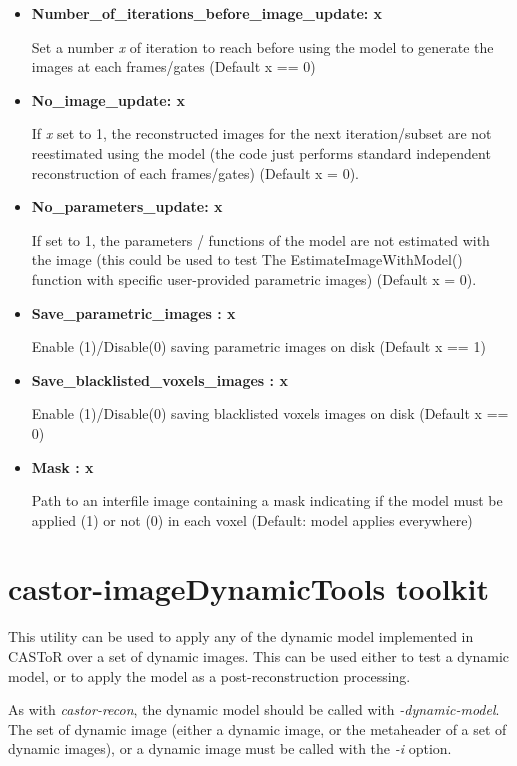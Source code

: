 \documentclass[a4paper, 11pt]{article}
\begin{document}
\begin{itemize}
\item \textbf{Number\_of\_iterations\_before\_image\_update: x}  

Set a number \textit{x} of iteration to reach before using the model to generate the images at each frames/gates (Default x ==  0) 
   
\item \textbf{No\_image\_update: x } 

If \textit{x} set to 1, the reconstructed images for the next iteration/subset are not reestimated using the model (the code just performs standard independent reconstruction of each frames/gates) (Default x = 0).       
          
\item \textbf{No\_parameters\_update: x} 

If set to 1, the parameters / functions of the model are not estimated with the image (this could be used to test The EstimateImageWithModel() function with specific user-provided parametric images) (Default x = 0).
   
\item \textbf{Save\_parametric\_images : x } 

Enable (1)/Disable(0) saving parametric images on disk (Default x == 1)  

\item \textbf{Save\_blacklisted\_voxels\_images : x } 

Enable (1)/Disable(0) saving blacklisted voxels images on disk (Default x == 0)  

\item \textbf{Mask : x } 

Path to an interfile image containing a mask indicating if the model must be applied (1) or not (0) in each voxel (Default: model applies everywhere)  

\end{itemize}


\bigskip
\section{castor-imageDynamicTools toolkit}
\label{s_dmodel_toolkit}

This utility can be used to apply any of the dynamic model implemented in CASToR over a set of dynamic images. This can be used either to test a dynamic model, or to apply the model as a post-reconstruction processing. 

\bigskip
As with \textit{ castor-recon}, the dynamic model should be called with \textit{-dynamic-model}. The set of dynamic image (either a dynamic image, or the metaheader of a set of dynamic images), or a dynamic image must be called with the \textit{-i} option. 
\end{document}
